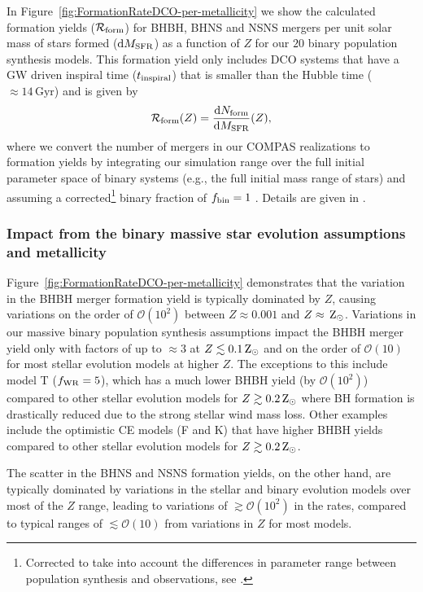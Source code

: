 \documentclass[fleqn,usenatbib]{mnras}
\newcommand\rate{\mathcal{R}}
\newcommand{\Zi}{\ensuremath{Z}\xspace}
\newcommand{\Zsun}{\ensuremath{\,\rm{Z}_{\odot}}\xspace}
\newcommand{\Gyr}{\ensuremath{\,\mathrm{Gyr}}\xspace}
\newcommand{\MSFR}{\ensuremath{{M}_{\rm{SFR}}}\xspace}
\newcommand{\tinspiral}{\ensuremath{{t}_{\rm{inspiral}}}\xspace}
\newcommand{\Nform}{\ensuremath{{N}_{\rm{form}}}\xspace}
\newcommand*\diff{\mathop{}\!\mathrm{d}}
\newcommand{\NmodelsBPS}{\ensuremath{20}\xspace}
\begin{document}
In Figure~\ref{fig:FormationRateDCO-per-metallicity} we show the calculated formation yields ($\rate_{\rm{form}}$) for \ac{BHBH}, \ac{BHNS} and \ac{NSNS} mergers per unit solar mass of stars formed ($\diff \MSFR$) as a function of \Zi for our \NmodelsBPS binary population synthesis models. This formation yield only includes \ac{DCO} systems that have a \ac{GW} driven inspiral time (\tinspiral) that is smaller than the Hubble time ($\approx 14\Gyr$) and is given by
%
\begin{align}
%
\rate_{\rm{form}}(\Zi) = 
 \frac{\diff \Nform}{\diff \MSFR } (\Zi), 
%
\label{eq:formation-rate-COMPAS}
\end{align}
%
where we convert the number of mergers in our COMPAS realizations to formation yields by integrating our simulation range over the full initial parameter space of binary systems (e.g., the full initial mass range of stars) and assuming a corrected\footnote{Corrected to take into account the differences in parameter range between population synthesis and observations, see \citet{deMinkBelczynski:2015}.} binary fraction of $f_{\rm{bin}}=1$ \citep[consistent with e.g.,][]{2017IAUS..329..110S}.  Details are given in  . 

\subsubsection{Impact from the binary massive star evolution assumptions and metallicity}

Figure~\ref{fig:FormationRateDCO-per-metallicity} demonstrates that the variation in the \ac{BHBH} merger formation yield is typically dominated by \Zi, causing variations on the order of $\mathcal{O}(10^2)$ between $\Zi\approx 0.001$ and $\Zi \approx \Zsun$. Variations in our massive binary population synthesis assumptions impact the \ac{BHBH} merger yield only with factors of up to $\approx 3$ at $\Zi \lesssim 0.1\Zsun$ and on the order of $\mathcal{O}(10)$ for most stellar evolution models at higher \Zi. The exceptions to this include model T ($f_{\rm{WR}}=5$), which has a much lower BHBH yield (by $\mathcal{O}(10^2)$) compared to other stellar evolution models for $\Zi \gtrsim 0.2\Zsun$ where BH formation is drastically reduced due to the strong stellar wind mass loss. Other examples include the optimistic \ac{CE} models (F and K) that have higher  \ac{BHBH} yields compared to other stellar evolution models for $\Zi \gtrsim 0.2\Zsun$. 

The scatter in the \ac{BHNS} and \ac{NSNS} formation yields, on the other hand, are typically dominated by variations in the stellar and binary evolution models over most of the \Zi range, leading to variations of $\gtrsim \mathcal{O}(10^2)$ in the rates, compared to typical ranges of $\lesssim \mathcal{O}(10)$ from variations in \Zi for most models.  
\end{document}
